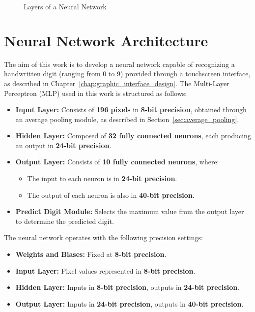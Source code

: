 \documentclass[11pt]{report}
\begin{document}
\begin{figure}[!ht]
{
}
\caption{Layers of a Neural Network}
\label{fig:NN_example}
\end{figure}

\section{Neural Network Architecture}
\label{sec:neural_network_architecture}

The aim of this work is to develop a neural network capable of recognizing a handwritten digit (ranging from 0 to 9) provided through a touchscreen interface, as described in Chapter~\ref{chap:graphic_interface_design}. The Multi-Layer Perceptron (MLP) used in this work is structured as follows:

\begin{itemize}
    \item \textbf{Input Layer:} Consists of \textbf{196 pixels} in \textbf{8-bit precision}, obtained through an average pooling module, as described in Section~\ref{sec:average_pooling}.
    \item \textbf{Hidden Layer:} Composed of \textbf{32 fully connected neurons}, each producing an output in \textbf{24-bit precision}.
    \item \textbf{Output Layer:} Consists of \textbf{10 fully connected neurons}, where:
    \begin{itemize}
        \item The input to each neuron is in \textbf{24-bit precision}.
        \item The output of each neuron is also in \textbf{40-bit precision}.
    \end{itemize}
    \item \textbf{Predict Digit Module:} Selects the maximum value from the output layer to determine the predicted digit.
\end{itemize}

The neural network operates with the following precision settings:
\begin{itemize}
    \item \textbf{Weights and Biases:} Fixed at \textbf{8-bit precision}.
    \item \textbf{Input Layer:} Pixel values represented in \textbf{8-bit precision}.
    \item \textbf{Hidden Layer:} Inputs in \textbf{8-bit precision}, outputs in \textbf{24-bit precision}.
    \item \textbf{Output Layer:} Inputs in \textbf{24-bit precision}, outputs in \textbf{40-bit precision}.
\end{itemize}
\end{document}
